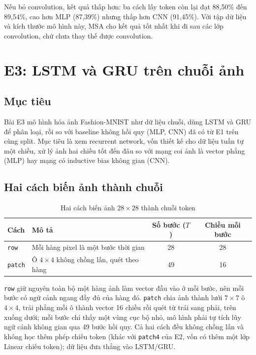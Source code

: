 \documentclass[12pt,a4paper]{article}
\begin{document}
Nếu bỏ convolution, kết quả thấp hơn: ba cách lấy token còn lại đạt 88,50\%
đến 89,54\%, cao hơn MLP (87,39\%) nhưng thấp hơn CNN (91,45\%). Với tập dữ
liệu và kích thước mô hình này, MSA cho kết quả tốt nhất khi đi sau các lớp
convolution, chứ chưa thay thế được convolution.

\clearpage
\section{E3: LSTM và GRU trên chuỗi ảnh}

\subsection{Mục tiêu}

Bài E3 mô hình hóa ảnh Fashion-MNIST như dữ liệu chuỗi, dùng LSTM và GRU để
phân loại, rồi so với baseline không hồi quy (MLP, CNN) đã có từ E1 trên cùng
split. Mục tiêu là xem recurrent network, vốn thiết kế cho dữ liệu tuần tự
một chiều, xử lý ảnh hai chiều tốt đến đâu so với mạng coi ảnh là vector phẳng
(MLP) hay mạng có inductive bias không gian (CNN).

\subsection{Hai cách biến ảnh thành chuỗi}

\begin{table}[H]
\centering
\caption{Hai cách biến ảnh $28{\times}28$ thành chuỗi token}
\label{tab:e3-seq}
\begin{tabular}{llcc}
\toprule
Cách & Mô tả & Số bước ($T$) & Chiều mỗi bước \\
\midrule
\texttt{row} & Mỗi hàng pixel là một bước thời gian & 28 & 28 \\
\texttt{patch} & Ô $4{\times}4$ không chồng lấn, quét theo hàng & 49 & 16 \\
\bottomrule
\end{tabular}
\end{table}

\texttt{row} giữ nguyên toàn bộ một hàng ảnh làm vector đầu vào ở mỗi bước, nên
mỗi bước có ngữ cảnh ngang đầy đủ của hàng đó. \texttt{patch} chia ảnh thành
lưới $7{\times}7$ ô $4{\times}4$, trải phẳng mỗi ô thành vector 16 chiều rồi
quét từ trái sang phải, trên xuống dưới; mỗi bước chỉ thấy một vùng cục bộ nhỏ,
mô hình phải tự tích lũy ngữ cảnh không gian qua 49 bước hồi quy. Cả hai cách
đều không chồng lấn và không học thêm phép chiếu token (khác với \texttt{patch4}
của E2, vốn có thêm một lớp Linear chiếu token); dữ liệu đưa thẳng vào
LSTM/GRU.
\end{document}
